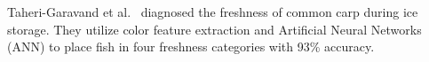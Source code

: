 \documentclass[conference]{IEEEtran}
\begin{document}
Taheri-Garavand et al.~\cite{TaheriGaravand2019RealtimeNM} diagnosed the
freshness of common carp during ice storage. They utilize color feature
extraction and Artificial Neural Networks (ANN) to place fish in four
freshness categories with 93\% accuracy.
\end{document}
